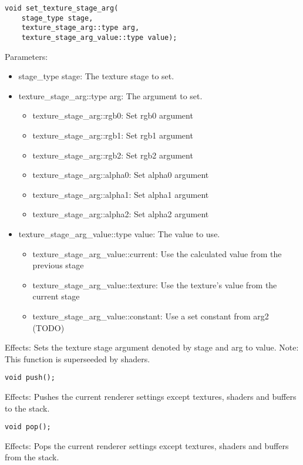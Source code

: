 \documentclass{article}
\begin{document}
\begin{lstlisting}
void set_texture_stage_arg(
	stage_type stage,
	texture_stage_arg::type arg,
	texture_stage_arg_value::type value);
\end{lstlisting}
Parameters:
\begin{itemize}
\item stage\_type stage: The texture stage to set.
\item texture\_stage\_arg::type arg: The argument to set.
  \begin{itemize}
  \item texture\_stage\_arg::rgb0: Set rgb0 argument
  \item texture\_stage\_arg::rgb1: Set rgb1 argument
  \item texture\_stage\_arg::rgb2: Set rgb2 argument
  \item texture\_stage\_arg::alpha0: Set alpha0 argument
  \item texture\_stage\_arg::alpha1: Set alpha1 argument
  \item texture\_stage\_arg::alpha2: Set alpha2 argument
  \end{itemize}
\item texture\_stage\_arg\_value::type value: The value to use.
  \begin{itemize}
  \item texture\_stage\_arg\_value::current: Use the calculated value from the previous stage
  \item texture\_stage\_arg\_value::texture: Use the texture's value from the current stage
  \item texture\_stage\_arg\_value::constant: Use a set constant from arg2 (TODO)
  \end{itemize}
\end{itemize}
Effects: Sets the texture stage argument denoted by stage and arg to value.
Note: This function is superseeded by shaders.

\begin{lstlisting}
void push();
\end{lstlisting}
Effects: Pushes the current renderer settings except textures, shaders and buffers to the stack.

\begin{lstlisting}
void pop();
\end{lstlisting}
Effects: Pops the current renderer settings except textures, shaders and buffers from the stack.
\end{document}
